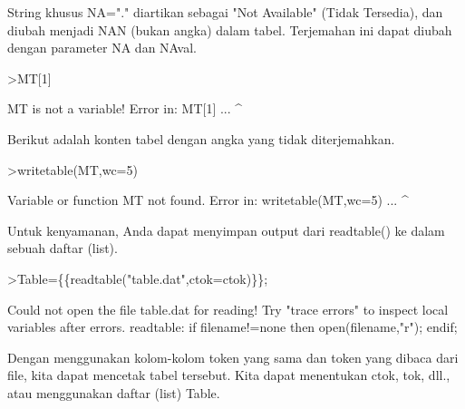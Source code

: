\documentclass[12pt,arial,letterpaper]{book}
\begin{document}
\begin{eulercomment}
\begin{eulercomment}
\begin{eulercomment}
\begin{eulercomment}
\begin{eulercomment}
\begin{eulercomment}
\begin{eulercomment}
\begin{eulercomment}
\begin{eulercomment}
\begin{eulercomment}
\begin{eulercomment}
\begin{eulercomment}
\begin{eulercomment}
\begin{eulercomment}
\begin{eulercomment}
\begin{eulercomment}
\begin{eulercomment}
\begin{eulercomment}
\begin{eulercomment}
\begin{eulercomment}
\begin{eulercomment}
\begin{eulercomment}
\begin{eulercomment}
\begin{eulercomment}
\begin{eulercomment}
\begin{eulercomment}
\begin{eulercomment}
\begin{eulercomment}
\begin{eulercomment}
\begin{eulercomment}
\begin{eulercomment}
\begin{eulercomment}
\begin{eulercomment}
String khusus NA="." diartikan sebagai "Not Available" (Tidak
Tersedia), dan diubah menjadi NAN (bukan angka) dalam tabel.
Terjemahan ini dapat diubah dengan parameter NA dan NAval.
\end{eulercomment}
\begin{eulerprompt}
>MT[1]
\end{eulerprompt}
\begin{euleroutput}
  MT is not a variable!
  Error in:
  MT[1] ...
       ^
\end{euleroutput}
\begin{eulercomment}
Berikut adalah konten tabel dengan angka yang tidak diterjemahkan.
\end{eulercomment}
\begin{eulerprompt}
>writetable(MT,wc=5)
\end{eulerprompt}
\begin{euleroutput}
  Variable or function MT not found.
  Error in:
  writetable(MT,wc=5) ...
               ^
\end{euleroutput}
\begin{eulercomment}
Untuk kenyamanan, Anda dapat menyimpan output dari readtable() ke
dalam sebuah daftar (list).
\end{eulercomment}
\begin{eulerprompt}
>Table=\{\{readtable("table.dat",ctok=ctok)\}\};
\end{eulerprompt}
\begin{euleroutput}
  Could not open the file
  table.dat
  for reading!
  Try "trace errors" to inspect local variables after errors.
  readtable:
      if filename!=none then open(filename,"r"); endif;
\end{euleroutput}
\begin{eulercomment}
Dengan menggunakan kolom-kolom token yang sama dan token yang dibaca
dari file, kita dapat mencetak tabel tersebut. Kita dapat menentukan
ctok, tok, dll., atau menggunakan daftar (list) Table.
\end{eulercomment}

\end{eulercomment}
\end{eulercomment}
\end{eulercomment}
\end{eulercomment}
\end{eulercomment}
\end{eulercomment}
\end{eulercomment}
\end{eulercomment}
\end{eulercomment}
\end{eulercomment}
\end{eulercomment}
\end{eulercomment}
\end{eulercomment}
\end{eulercomment}
\end{eulercomment}
\end{eulercomment}
\end{eulercomment}
\end{eulercomment}
\end{eulercomment}
\end{eulercomment}
\end{eulercomment}
\end{eulercomment}
\end{eulercomment}
\end{eulercomment}
\end{eulercomment}
\end{eulercomment}
\end{eulercomment}
\end{eulercomment}
\end{eulercomment}
\end{eulercomment}
\end{eulercomment}
\end{eulercomment}
\end{document}

